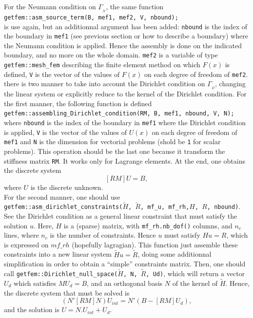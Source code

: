 \documentclass[11pt,a4paper]{article}
\begin{document}
For the Neumann condition on $\Gamma_{_N}$, the same function\\[0.5cm]
{\tt getfem::asm\_source\_term(B, mef1, mef2, V, nbound);} \\[0.5cm]
is use again, but an additionnal argument has been added: {\tt nbound} is the index of the boundary in {\tt mef1} (see previous section or how to describe a boundary) where the Neumann condition is applied. Hence the assembly is done on the indicated boundary, and no more on the whole domain. {\tt mef2}  is a variable of type {\tt getfem::mesh\_fem} describing the finite element method on which $F(x)$ is defined, {\tt V} is the vector of the values of $F(x)$ on each degree of freedom of {\tt mef2}.\\[0.5cm]
there is two manner to take into account the Dirichlet condition on $\Gamma_{_D}$, changing the linear system or explicitly reduce to the kernel of the Dirichlet condition. For the first manner, the following function is defined \\[0.5cm]
{\tt getfem::assembling\_Dirichlet\_condition(RM, B, mef1, nbound, V, N);} \\[0.5cm]
where {\tt nbound} is the index of the boundary in {\tt mef1} where the Dirichlet condition is applied, {\tt V} is the vector of the values of $U(x)$ on each degree of freedom of {\tt mef1} and {\tt N} is the dimension for vectorial problems (shold be {\tt 1} for scalar problems). This operation should be the last one because it transform the stiffness matrix {\tt RM}. It works only for Lagrange elements. At the end, one obtains the discrete system
$$ [RM] U = B, $$
where $U$ is the discrete unknown.\\[0.5cm]

For the second manner, one should use\\[0.5cm]
{\tt getfem::asm\_dirichlet\_constraints($\tilde{H}$, $\tilde{R}$, mf\_u, mf\_rh,$H$, $R$, nbound)}. See the Dirichlet condition as a general linear constraint that must satisfy the solution $u$. Here, $H$ is a (sparse) matrix, with {\tt mf\_rh.nb\_dof()} columns, and $n_c$ lines, where $n_c$ is the number of constraints. Hence $u$ must satisfy $Hu=R$, which is expressed on $mf\_rh$ (hopefully lagragian). This function just assemble these constraints into a new linear system $\tilde{H}u=\tilde{R}$, doing some additionnal simplification in order to obtain a ``simple'' constraints matrix.
Then, one should call {\tt getfem::Dirichlet\_null_space($\tilde{H}$, N, $\tilde{R}$, Ud)}, which will return a vector $U_d$ which satisfies $MU_d=B$, and an orthogonal basis $N$ of the kernel of $\tilde{H}$. Hence, the discrete system that must be solved is 
$$ (N'[RM]N) U_{int}=N'(B-[RM]U_d),$$
and the solution is $U=N.U_{int}+U_d$.
\end{document}
